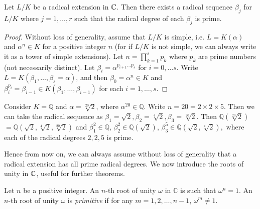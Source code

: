 \begin{theorem} \label{thm:radical-single-prime}
	Let $L / K$ be a radical extension in $\mathbb C$. Then there exists a radical sequence $\beta_j$ for $L / K$ where $j=1, \dots, r$ such that the radical degree of each $\beta_j$ is prime.
\end{theorem}

\begin{proof}
	Without loss of generality, assume that $L/K$ is simple, i.e.  $L = K (\alpha)$ and $\alpha ^ n \in K$ for a positive integer $n$ (for if $L/K$ is not simple, we can always write it as a tower of simple extensions). Let $n = \prod_{k=1}^{s} p_{k}$ where $p_{k}$ are prime numbers (not necessarily distinct). Let $\beta_{i} = \alpha^ {p_{i + 1} \dots  p_{s}}$ for $i = 0, \dots s$. Write $L = K(\beta_1,  \dots, \beta_s = \alpha)$, and then $\beta_0 = \alpha^n \in K$ and  $\beta_i ^ {p_i} = \beta_{i-1} \in K(\beta_1, \dots, \beta_{i - 1})$ for each $i  = 1, \dots, s$. 
\end{proof}

\begin{example} \label{exm:radical-sequence-prime}
	Consider $K  = \mathbb Q$ and $\alpha = \sqrt[20]{2}$, where $\alpha ^ {20} \in \mathbb Q$. Write $n = 20 =  2 \times 2 \times 5 $. Then we can take the radical sequence as $\beta_1 = \sqrt 2, \beta_2 = \sqrt[4]{2}, \beta_3 = \sqrt[20]{2}$. Then $\mathbb Q(\sqrt[20]{2}) $ $= \mathbb Q(\sqrt{2}, \sqrt[4]{2}, \sqrt[20]{2})$ and 
	$
	\beta_1 ^ 2 \in \mathbb Q, \, \beta_2 ^ 2 \in \mathbb Q(\sqrt{2}), \, \beta_3^5 \in \mathbb Q (\sqrt{2}, \sqrt[4]{2}),
	$
	where each of the radical degrees $2, 2, 5$ is prime.
\end{example}

Hence from now on, we can always assume without loss of generality that a radical extension has all prime radical degrees. We now introduce the roots of unity in $\mathbb C$, useful for further theorems. 


\begin{definition}
	Let $n$ be a positive integer. An $n$-th root of unity $\omega$ in $\mathbb C$ is such that $\omega ^ n = 1$. An $n$-th root of unity $\omega$ is \textit{primitive} if for any $m = 1, 2, \dots, n - 1$, $\omega ^ m \neq 1$.
\end{definition}


